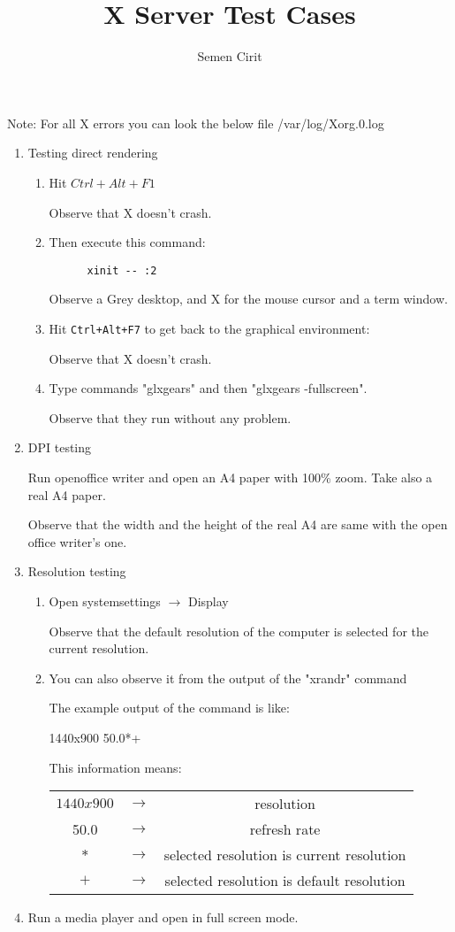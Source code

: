 \documentclass[a4paper,10pt]{article}
\title{X Server Test Cases}
\author{Semen Cirit}
\begin{document}
\maketitle

 Note:	
  	For all X errors you can look the below file
	/var/log/Xorg.0.log  
\begin{enumerate}
  \item Testing direct rendering
    \begin{enumerate}
    \item  Hit $Ctrl+Alt+F1$

	    Observe that X doesn't crash.
    \item  Then execute this command:
	  \begin{verbatim}
	  xinit -- :2
	  \end{verbatim}
	  Observe a Grey desktop, and X for the mouse cursor and a term window.
    \item Hit \texttt{Ctrl+Alt+F7} to get back to the graphical environment:
    
	  Observe that X doesn't crash.
    \item Type commands "glxgears" and then "glxgears -fullscreen".

	  Observe that they run without any problem.
    \end{enumerate}

  \item DPI testing
    
        Run openoffice writer and open an A4 paper with 100\% zoom. Take also a real A4 paper.

        Observe that the width and the height of the real A4 are same with the open office writer's one.
  \item Resolution testing
     \begin{enumerate}
      \item Open systemsettings $\rightarrow$ Display

	Observe that the default resolution of the computer is selected for the current resolution.
      \item You can also observe it from the output of the "xrandr" command
	  
	  The example output of the command is like:
	  
	  1440x900  50.0*+
	  
	  This information means:
	  \begin{table}[h]
	  \centering
	  \begin{tabular}{|c|c|c|}
		  \hline
		  $1440x900$ & $\rightarrow$ & resolution \\
		  50.0       & $\rightarrow$ & refresh rate \\
		  $*$        & $\rightarrow$ & selected resolution is current resolution \\
		  $+$        & $\rightarrow$ & selected resolution is default resolution \\
		  \hline
	  \end{tabular} 
	  \label{tab:tbl}
	  \end{table}
    \end{enumerate}
 \item  Run a media player and open in full screen mode.


\end{enumerate}
\end{document}
